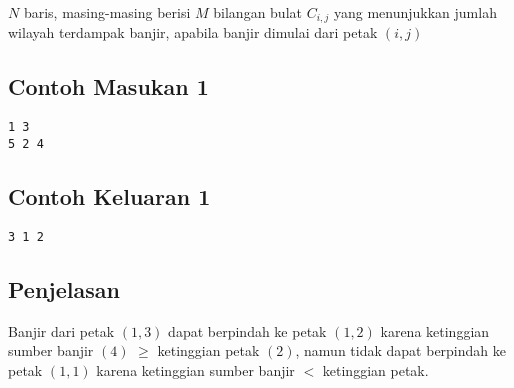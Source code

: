 \documentclass{article}
\begin{document}
$N$ baris, masing-masing berisi $M$ bilangan bulat $C_{i,j}$ yang menunjukkan jumlah wilayah terdampak banjir, apabila banjir dimulai dari petak $(i,j)$

\begin{multicols}{2}
\subsection*{Contoh Masukan 1}
\begin{lstlisting}
1 3
5 2 4
\end{lstlisting}
\columnbreak
\subsection*{Contoh Keluaran 1}
\begin{lstlisting}
3 1 2
\end{lstlisting}
\vfill
\null
\end{multicols}


\subsection*{Penjelasan}

Banjir dari petak $(1,3)$ dapat berpindah ke petak $(1,2)$ karena ketinggian sumber banjir $(4)$ $\geq$ ketinggian petak $(2)$, namun tidak dapat berpindah ke petak $(1,1)$ karena ketinggian sumber banjir $<$ ketinggian petak.
\end{document}
